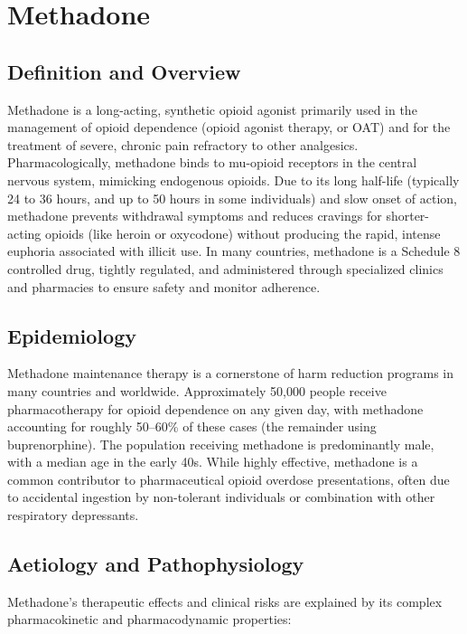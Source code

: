 \chapter{Methadone}

\section*{Definition and Overview}
Methadone is a long-acting, synthetic opioid agonist primarily used in the management of opioid dependence (opioid agonist therapy, or OAT) and for the treatment of severe, chronic pain refractory to other analgesics. Pharmacologically, methadone binds to mu-opioid receptors in the central nervous system, mimicking endogenous opioids. Due to its long half-life (typically 24 to 36 hours, and up to 50 hours in some individuals) and slow onset of action, methadone prevents withdrawal symptoms and reduces cravings for shorter-acting opioids (like heroin or oxycodone) without producing the rapid, intense euphoria associated with illicit use. In many countries, methadone is a Schedule 8 controlled drug, tightly regulated, and administered through specialized clinics and pharmacies to ensure safety and monitor adherence.

\section*{Epidemiology}
Methadone maintenance therapy is a cornerstone of harm reduction programs in many countries and worldwide. Approximately 50,000 people receive pharmacotherapy for opioid dependence on any given day, with methadone accounting for roughly 50--60\% of these cases (the remainder using buprenorphine). The population receiving methadone is predominantly male, with a median age in the early 40s. While highly effective, methadone is a common contributor to pharmaceutical opioid overdose presentations, often due to accidental ingestion by non-tolerant individuals or combination with other respiratory depressants.

\section*{Aetiology and Pathophysiology}
Methadone's therapeutic effects and clinical risks are explained by its complex pharmacokinetic and pharmacodynamic properties:

